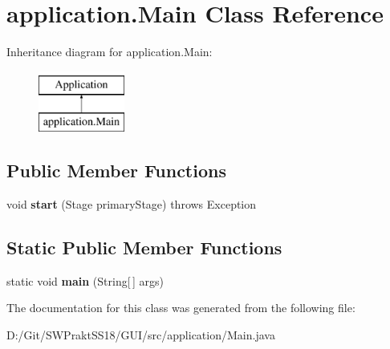 \hypertarget{classapplication_1_1_main}{}\section{application.\+Main Class Reference}
\label{classapplication_1_1_main}
Inheritance diagram for application.\+Main\+:\begin{figure}[H]
\begin{center}
\leavevmode
\includegraphics[height=2.000000cm]{classapplication_1_1_main}
\end{center}
\end{figure}
\subsection*{Public Member Functions}
\begin{DoxyCompactItemize}
\item 
\mbox{\label{classapplication_1_1_main_a4e5ad4e3de8bbd8654120180a94e870d}} 
void {\bfseries start} (Stage primary\+Stage)  throws Exception
\end{DoxyCompactItemize}
\subsection*{Static Public Member Functions}
\begin{DoxyCompactItemize}
\item 
\mbox{\label{classapplication_1_1_main_a0de7d10858e36e34a0836c2c6c02c4fc}} 
static void {\bfseries main} (String\mbox{[}$\,$\mbox{]} args)
\end{DoxyCompactItemize}


The documentation for this class was generated from the following file\+:\begin{DoxyCompactItemize}
\item 
D\+:/\+Git/\+S\+W\+Prakt\+S\+S18/\+G\+U\+I/src/application/Main.\+java\end{DoxyCompactItemize}
